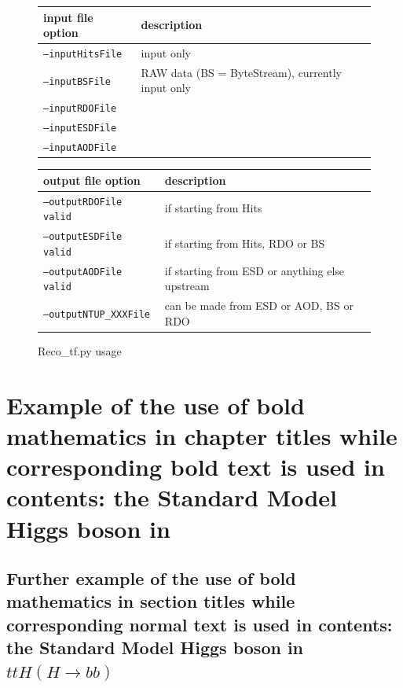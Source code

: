 \begin{figure}[h]
\begin{center}
\scriptsize
\begin{tabular}{p{3 cm}p{7 cm}}
\hline\hline
input file option&description\\
\hline
\texttt{--inputHitsFile}&input only\\
\texttt{--inputBSFile}&RAW data (BS = ByteStream), currently input only\\
\texttt{--inputRDOFile}&\\
\texttt{--inputESDFile}&\\
\texttt{--inputAODFile}&\\
\hline\hline
\end{tabular}
\end{center}
\mbox{}\newline
\begin{center}
\scriptsize
\begin{tabular}{p{3 cm}p{7 cm}}
\hline\hline
output file option&description\\
\hline
\texttt{--outputRDOFile	valid}&if starting from Hits\\
\texttt{--outputESDFile	valid}&if starting from Hits, RDO or BS\\
\texttt{--outputAODFile	valid}&if starting from ESD or anything else upstream\\
\texttt{--outputNTUP\_XXXFile}&can be made from ESD or AOD, BS or RDO\\
\hline\hline
\end{tabular}
\end{center}
\caption{Reco\_tf.py usage}
\end{figure}

\chapter{Example of the use of bold mathematics in chapter titles while corresponding bold text is used in contents: the Standard Model Higgs boson in \texorpdfstring{\boldttHbb}{ttH(H\to bb)}}

\section{Further example of the use of bold mathematics in section titles while corresponding normal text is used in contents: the Standard Model Higgs boson in ${ttH(H\to bb)}$}
